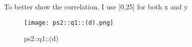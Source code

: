 \begin{answer}

To better show the correlation, I use [0,25] for both x and y

\begin{figure}[H]
    \centering
    \texttt{[image: ps2::q1::(d).png]}
    \caption{ps2::q1::(d)}
    \label{fig:enter-label}
\end{figure}
\end{answer}
